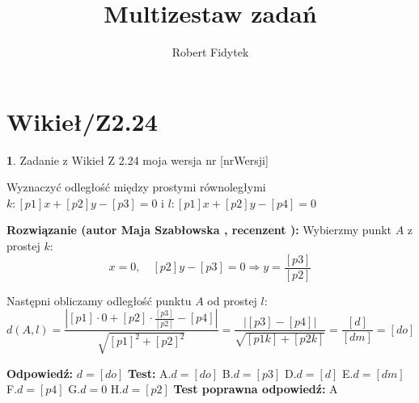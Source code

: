 \documentclass[12pt, a4paper]{article}
\title{Multizestaw zadań}
\author{Robert Fidytek}
\date{}
\theoremstyle{definition} %
\newtheorem{zad}{}
\newcommand{\kategoria}[1]{\section{#1}} %
\newcommand{\zadStart}[1]{\begin{zad}#1\newline} %
\newcommand{\zadStop}{\end{zad}}   %
\newcommand{\rozwStart}[2]{\noindent \textbf{Rozwiązanie (autor #1 , recenzent #2): }\newline} %
\newcommand{\rozwStop}{\newline}                                            %
\newcommand{\odpStart}{\noindent \textbf{Odpowiedź:}\newline}    %
\newcommand{\odpStop}{\newline}                                             %
\newcommand{\testStart}{\noindent \textbf{Test:}\newline} %
\newcommand{\testStop}{\newline} %
\newcommand{\kluczStart}{\noindent \textbf{Test poprawna odpowiedź:}\newline} %
\newcommand{\kluczStop}{\newline} %
\begin{document}
\maketitle


\kategoria{Wikieł/Z2.24}
\zadStart{Zadanie z Wikieł Z 2.24  moja wersja nr [nrWersji]}


Wyznaczyć odległość między prostymi równoległymi $k:[p1]x+[p2]y-[p3]=0$ i $l:[p1]x+[p2]y-[p4]=0$
\zadStop

\rozwStart{Maja Szabłowska}{}
Wybierzmy punkt $A$ z prostej $k$:
$$x=0, \quad [p2]y-[p3]=0 \Rightarrow y=\frac{[p3]}{[p2]}$$

Następni obliczamy odległość punktu $A$ od prostej $l$:
$$d(A,l)=\frac{|[p1]\cdot0+[p2]\cdot\frac{[p3]}{[p2]}-[p4]|}{\sqrt{[p1]^{2}+[p2]^{2}}}=\frac{|[p3]-[p4]|}{\sqrt{[p1k]+[p2k]}}=\frac{[d]}{[dm]}=[do]$$
\rozwStop


\odpStart
$d=[do]$
\odpStop
\testStart
A.$d=[do]$
B.$d=[p3]$
D.$d=[d]$
E.$d=[dm]$
F.$d=[p4]$
G.$d=0$
H.$d=[p2]$
\testStop
\kluczStart
A
\kluczStop
\end{document}

